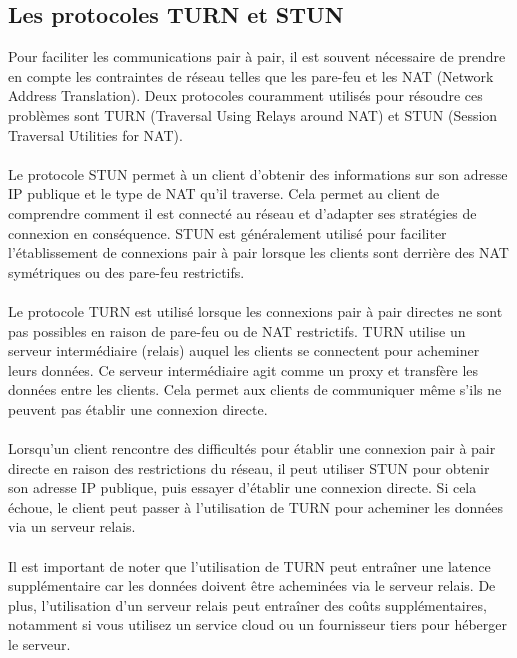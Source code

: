 \subsection{Les protocoles TURN et STUN}

Pour faciliter les communications pair à pair, il est souvent nécessaire de prendre en compte les contraintes de réseau telles que les pare-feu et les NAT (Network Address Translation). Deux protocoles couramment utilisés pour résoudre ces 
problèmes sont TURN (Traversal Using Relays around NAT) et STUN (Session Traversal Utilities for NAT).

\paragraph{}
Le protocole STUN permet à un client d'obtenir des informations sur son adresse IP publique et le type de NAT qu'il traverse. Cela permet au client de comprendre comment il est connecté au réseau et d'adapter ses stratégies de 
connexion en conséquence. STUN est généralement utilisé pour faciliter l'établissement de connexions pair à pair lorsque les clients sont derrière des NAT symétriques ou des pare-feu restrictifs.

\paragraph{}
Le protocole TURN est utilisé lorsque les connexions pair à pair directes ne sont pas possibles en raison de pare-feu ou de NAT restrictifs. TURN utilise un serveur intermédiaire (relais) auquel les clients se connectent pour acheminer 
leurs données. Ce serveur intermédiaire agit comme un proxy et transfère les données entre les clients. Cela permet aux clients de communiquer même s'ils ne peuvent pas établir une connexion directe.

\paragraph{}
Lorsqu'un client rencontre des difficultés pour établir une connexion pair à pair directe en raison des restrictions du réseau, il peut utiliser STUN pour obtenir son adresse IP publique, puis essayer d'établir une connexion directe. 
Si cela échoue, le client peut passer à l'utilisation de TURN pour acheminer les données via un serveur relais.

\paragraph{}
Il est important de noter que l'utilisation de TURN peut entraîner une latence supplémentaire car les données doivent être acheminées via le serveur relais. De plus, l'utilisation d'un serveur relais peut entraîner des coûts supplémentaires, 
notamment si vous utilisez un service cloud ou un fournisseur tiers pour héberger le serveur.

